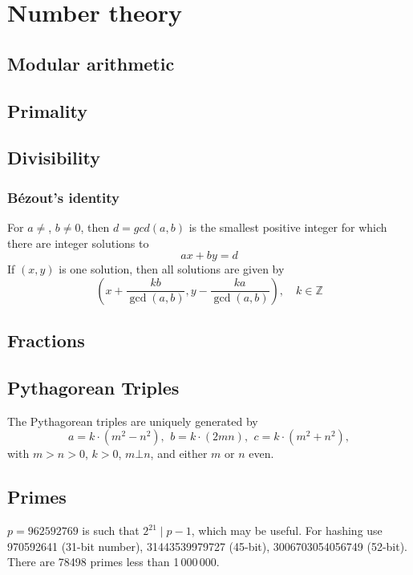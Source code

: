 \chapter{Number theory}

\section{Modular arithmetic}

\section{Primality}

\section{Divisibility}
	

	\subsection{Bézout's identity}
	For $a \neq $, $b \neq 0$, then $d=gcd(a,b)$ is the smallest positive integer for which there are integer solutions to
	$$ax+by=d$$
	If $(x,y)$ is one solution, then all solutions are given by
	$$\left(x+\frac{kb}{\gcd(a,b)}, y-\frac{ka}{\gcd(a,b)}\right), \quad k\in\mathbb{Z}$$


\section{Fractions}

\section{Pythagorean Triples}
 The Pythagorean triples are uniquely generated by
 \[ a=k\cdot (m^{2}-n^{2}),\ \,b=k\cdot (2mn),\ \,c=k\cdot (m^{2}+n^{2}), \]
 with $m > n > 0$, $k > 0$, $m \bot n$, and either $m$ or $n$ even.

\section{Primes}
	$p=962592769$ is such that $2^{21} \mid p-1$, which may be useful. For hashing
	use 970592641 (31-bit number), 31443539979727 (45-bit), 3006703054056749
	(52-bit). There are 78498 primes less than 1\,000\,000.

